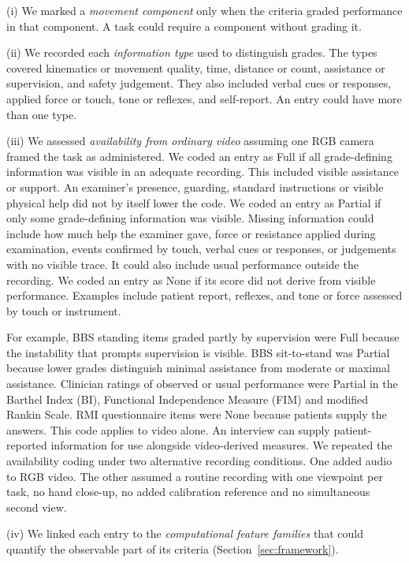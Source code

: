 \documentclass[11pt]{article}
\begin{document}
(i) We marked a \emph{movement component} only when the criteria graded performance in that component. A task could require a component without grading it.

(ii) We recorded each \emph{information type} used to distinguish grades. The types covered kinematics or movement quality, time, distance or count, assistance or supervision, and safety judgement. They also included verbal cues or responses, applied force or touch, tone or reflexes, and self-report. An entry could have more than one type.

(iii) We assessed \emph{availability from ordinary video} assuming one RGB camera framed the task as administered. We coded an entry as Full if all grade-defining information was visible in an adequate recording. This included visible assistance or support. An examiner's presence, guarding, standard instructions or visible physical help did not by itself lower the code. We coded an entry as Partial if only some grade-defining information was visible. Missing information could include how much help the examiner gave, force or resistance applied during examination, events confirmed by touch, verbal cues or responses, or judgements with no visible trace. It could also include usual performance outside the recording. We coded an entry as None if its score did not derive from visible performance. Examples include patient report, reflexes, and tone or force assessed by touch or instrument.

For example, BBS standing items graded partly by supervision were Full because the instability that prompts supervision is visible. BBS sit-to-stand was Partial because lower grades distinguish minimal assistance from moderate or maximal assistance. Clinician ratings of observed or usual performance were Partial in the Barthel Index (BI), Functional Independence Measure (FIM) and modified Rankin Scale. RMI questionnaire items were None because patients supply the answers. This code applies to video alone. An interview can supply patient-reported information for use alongside video-derived measures. We repeated the availability coding under two alternative recording conditions. One added audio to RGB video. The other assumed a routine recording with one viewpoint per task, no hand close-up, no added calibration reference and no simultaneous second view.

(iv) We linked each entry to the \emph{computational feature families} that could quantify the observable part of its criteria (Section~\ref{sec:framework}).
\end{document}
